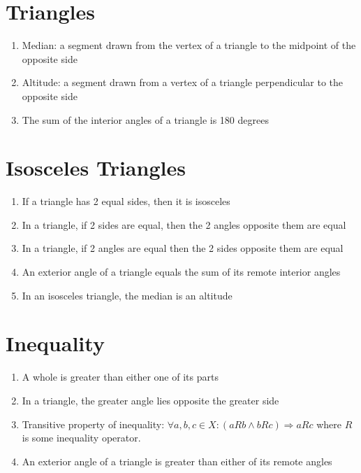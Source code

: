 \documentclass[11pt,letterpaper]{report}
\begin{document}
\section*{Triangles}
\begin{enumerate}
    \item Median: a segment drawn from the vertex of a triangle to the midpoint of the opposite side
    \item Altitude: a segment drawn from a vertex of a triangle perpendicular to the opposite side
    \item The sum of the interior angles of a triangle is 180 degrees
\end{enumerate}

\section*{Isosceles Triangles}
\begin{enumerate}
    \item If a triangle has 2 equal sides, then it is isosceles
    \item In a triangle, if 2 sides are equal, then the 2 angles opposite them are equal
    \item In a triangle, if 2 angles are equal then the 2 sides opposite them are equal
    \item An exterior angle of a triangle equals the sum of its remote interior angles
    \item In an isosceles triangle, the median is an altitude
\end{enumerate}
\section*{Inequality}
\begin{enumerate}
    \item A whole is greater than either one of its parts
    \item In a triangle, the greater angle lies opposite the greater side
    \item Transitive property of inequality: $\forall a,b,c\in X:(aRb\wedge bRc)\Rightarrow aRc$ where $R$ is some inequality operator.
    \item An exterior angle of a triangle is greater than either of its remote angles
\end{enumerate}
\end{document}
